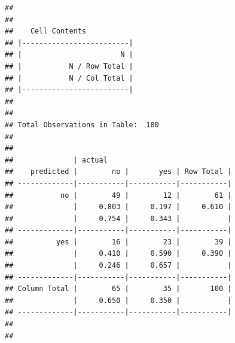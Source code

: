 \documentclass[]{article}
\begin{document}
\begin{verbatim}
## 
##  
##    Cell Contents
## |-------------------------|
## |                       N |
## |           N / Row Total |
## |           N / Col Total |
## |-------------------------|
## 
##  
## Total Observations in Table:  100 
## 
##  
##              | actual 
##    predicted |        no |       yes | Row Total | 
## -------------|-----------|-----------|-----------|
##           no |        49 |        12 |        61 | 
##              |     0.803 |     0.197 |     0.610 | 
##              |     0.754 |     0.343 |           | 
## -------------|-----------|-----------|-----------|
##          yes |        16 |        23 |        39 | 
##              |     0.410 |     0.590 |     0.390 | 
##              |     0.246 |     0.657 |           | 
## -------------|-----------|-----------|-----------|
## Column Total |        65 |        35 |       100 | 
##              |     0.650 |     0.350 |           | 
## -------------|-----------|-----------|-----------|
## 
## 
\end{verbatim}
\end{document}
